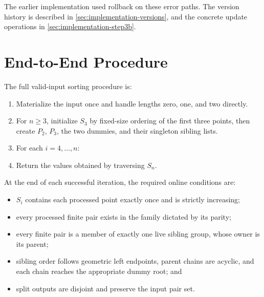 The earlier implementation used rollback on these error paths. The version
history is described in \cref{sec:implementation-versions}, and the concrete
update operations in \cref{sec:implementation-step3b}.

\section{End-to-End Procedure}
\label{sec:algorithm-procedure}

The full valid-input sorting procedure is:
\begin{enumerate}[itemsep=0.25em]
  \item Materialize the input once and handle lengths zero, one, and two
    directly.
  \item For $n\geq 3$, initialize $S_3$ by fixed-size ordering of the first
    three points, then create $P_2$, $P_3$, the two dummies, and their
    singleton sibling lists.
  \item For each $i=4,\ldots,n$:
  \item Return the values obtained by traversing $S_n$.
\end{enumerate}

At the end of each successful iteration, the required online conditions are:
\begin{itemize}[itemsep=0.2em]
  \item $S_i$ contains each processed point exactly once and is strictly
    increasing;
  \item every processed finite pair exists in the family dictated by its
    parity;
  \item every finite pair is a member of exactly one live sibling group,
    whose owner is its parent;
  \item sibling order follows geometric left endpoints, parent chains are
    acyclic, and each chain reaches the appropriate dummy root; and
  \item split outputs are disjoint and preserve the input pair set.
\end{itemize}

